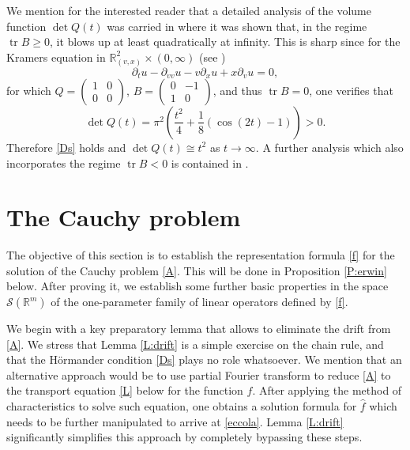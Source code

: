 \documentclass[11pt,a4paper]{amsart}
\def \R {\mathbb{R}}
\def \So {\mathscr{S}(\Rm)}
\newcommand{\Rm}{\mathbb R^m}
\newcommand{\p}{\partial}
\numberwithin{equation}{section}
\newcommand{\tr}{\operatorname{tr}}
\numberwithin{equation}{section}
\begin{document}
We mention for the interested reader that a detailed analysis of the volume function $\det Q(t)$ was carried in \cite{G&liarMA} where it was shown that, in the regime $\operatorname{tr} B\ge 0$, it blows up at least quadratically at infinity. This is sharp since for the Kramers equation in $\R^2_{(v,x)}\times (0,\infty)$ (see \cite{Bri})
\[
\p_t u - \p_{vv} u - v\p_x u + x\p_v u = 0,
\]
for which $Q = \begin{pmatrix} 1 & 0\\ 0 & 0\end{pmatrix}$, $B = \begin{pmatrix} 0 & -1\\ 1 & 0\end{pmatrix}$, and thus $\tr B = 0$, one verifies that 
\[
\det Q(t) = \pi^2(\frac{t^2}4 +\frac 18(\cos(2t) -1))>0.
\]
Therefore \eqref{Ds} holds and $\det Q(t) \cong t^2$ as $t\to \infty$.
A further analysis  which also incorporates the regime $\tr B<0$ is contained in \cite[Proposition 2.3]{BG&liar}. 







\section{The Cauchy problem}\label{S:erwin}

The  objective of this section is to establish the representation formula \eqref{f} for the solution of the Cauchy problem \eqref{A}. This will be done in Proposition \ref{P:erwin} below. After proving it, we establish some further basic properties in the space $\So$ of the one-parameter family of linear operators defined by \eqref{f}. 

We begin with a key preparatory lemma that allows to eliminate the drift from \eqref{A}. We stress that Lemma \ref{L:drift} is a simple exercise on the chain rule, and that the H\"ormander condition \eqref{Ds} plays no role whatsoever. 
We mention that an alternative approach would be to use partial Fourier transform to reduce \eqref{A} to the transport equation \eqref{L} below for the function $\hat f$. After applying the method of characteristics to solve such equation, one obtains a solution formula for $\hat f$ which needs to be further manipulated to arrive at \eqref{eccola}. Lemma \ref{L:drift} significantly simplifies this approach by completely bypassing these steps. 
\end{document}
